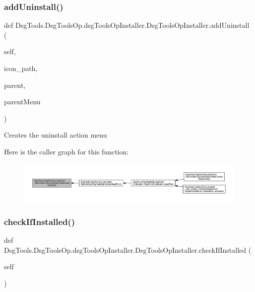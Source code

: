 \subsubsection{\texorpdfstring{add\+Uninstall()}{addUninstall()}}
{\footnotesize\ttfamily def Dsg\+Tools.\+Dsg\+Tools\+Op.\+dsg\+Tools\+Op\+Installer.\+Dsg\+Tools\+Op\+Installer.\+add\+Uninstall (\begin{DoxyParamCaption}\item[{}]{self,  }\item[{}]{icon\+\_\+path,  }\item[{}]{parent,  }\item[{}]{parent\+Menu }\end{DoxyParamCaption})}

\begin{DoxyVerb}Creates the uninstall action menu
\end{DoxyVerb}
 Here is the caller graph for this function\+:
\nopagebreak
\begin{figure}[H]
\begin{center}
\leavevmode
\includegraphics[width=350pt]{class_dsg_tools_1_1_dsg_tools_op_1_1dsg_tools_op_installer_1_1_dsg_tools_op_installer_a897f1ecb8ca6dba671824ad1f0239a9a_icgraph}
\end{center}
\end{figure}
\mbox{\label{class_dsg_tools_1_1_dsg_tools_op_1_1dsg_tools_op_installer_1_1_dsg_tools_op_installer_a842447891342fd09df0718506c3c69ee}} 
\subsubsection{\texorpdfstring{check\+If\+Installed()}{checkIfInstalled()}}
{\footnotesize\ttfamily def Dsg\+Tools.\+Dsg\+Tools\+Op.\+dsg\+Tools\+Op\+Installer.\+Dsg\+Tools\+Op\+Installer.\+check\+If\+Installed (\begin{DoxyParamCaption}\item[{}]{self }\end{DoxyParamCaption})}

